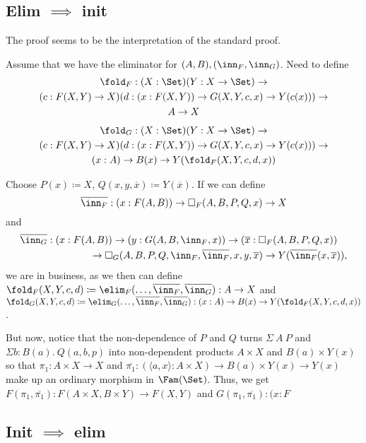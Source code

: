 \documentclass{article}
\begin{document}
\subsection{Elim $\implies$ init}

The proof seems to be the interpretation of the standard proof.

Assume that we have the eliminator for $(A, B), (\inn_F, \inn_G)$. Need to define
\begin{multline*}
  \fold_F : (X : \Set)(Y : X \to \Set) \to \\
  (c : F(X, Y) \to X)(d : (x : F(X, Y)) \to G(X, Y, c, x) \to Y(c(x))) \to \\
  A \to X
\end{multline*}
\begin{multline*}
  \fold_G : (X : \Set)(Y : X \to \Set) \to \\
  (c : F(X, Y) \to X)(d : (x : F(X, Y)) \to G(X, Y, c, x) \to Y(c(x))) \to \\
  (x : A) \to B(x) \to Y(\fold_F(X, Y, c, d, x))
\end{multline*}

Choose $P(x) \coloneqq X$, $Q(x, y, \overline{x}) \coloneqq
Y(\overline{x})$. If we can define
\[
\overline{\inn_F} : (x : F(A, B)) \to \square_{F}(A, B, P, Q, x) \to X
\]
and
\[
 \begin{multlined}
  \overline{\inn_G} : (x : F(A, B)) \to (y : G(A, B, \inn_F, x)) \to
   (\overline{x} : \square_F(A, B, P, Q, x)) \\ \to
   \square_{G}(A, B, P, Q, \inn_F, \overline{\inn_F}, x, y,
   \overline{x}) \to Y(\overline{\inn_F}(x, \overline{x})),
 \end{multlined}
\]
we are in business, as we then can define $\fold_F(X, Y, c, d)
\coloneqq \elim_F(\ldots, \overline{\inn_F}, \overline{\inn_G}) : A
\to X$ and $\fold_G(X, Y, c, d) \coloneqq \elim_G(\ldots,
\overline{\inn_F}, \overline{\inn_G}) : (x : A) \to B(x) \to
Y(\fold_F(X, Y, c, d, x))$.

But now, notice that the non-dependence of $P$ and $Q$ turns $\Sigma\
A\ P$ and $\Sigma b\!:\!B(a).\ Q(a, b, p)$ into non-dependent products
$A \times X$ and $B(a) \times Y(x)$ so that $\pi_1 : A \times X \to X$
and $\overline{\pi_1} : (\langle a, x\rangle : A \times X) \to B(a)
\times Y(x) \to Y(x)$ make up an ordinary morphism in
$\Fam(\Set)$. Thus, we get $F(\pi_1, \overline{\pi_1}) : F(A \times X,
B \times Y) \to F(X , Y)$ and $G(\pi_1, \overline{\pi_1}) : (x : F$


\subsection{Init $\implies$ elim}
\end{document}
